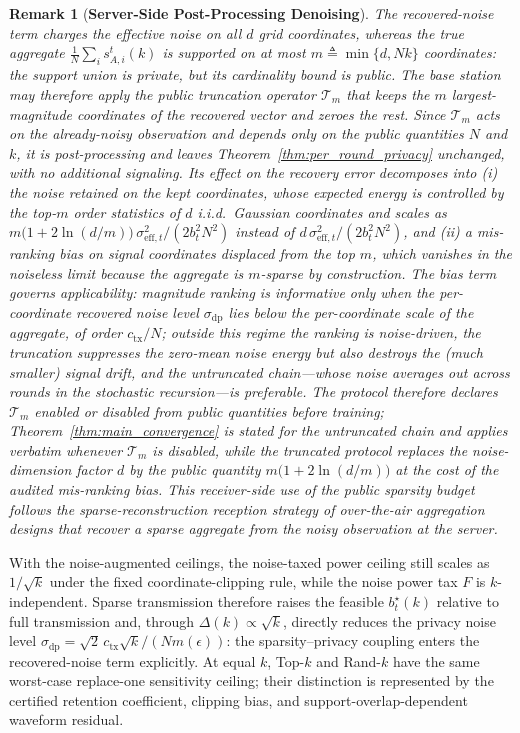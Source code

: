 \documentclass[journal]{IEEEtran}
\newtheorem{remark}{Remark}
\begin{document}
\begin{remark}[\bf Server-Side Post-Processing Denoising]
    \label{rem:denoise}
    The recovered-noise term charges the effective noise on all $d$ grid coordinates, whereas the true aggregate $\frac1N\sum_i s_{A,i}^t(k)$ is supported on at most $m\triangleq\min\{d,Nk\}$ coordinates: the support union is private, but its cardinality bound is public. The base station may therefore apply the public truncation operator $\mathcal T_m$ that keeps the $m$ largest-magnitude coordinates of the recovered vector and zeroes the rest. Since $\mathcal T_m$ acts on the already-noisy observation and depends only on the public quantities $N$ and $k$, it is post-processing and leaves Theorem~\ref{thm:per_round_privacy} unchanged, with no additional signaling. Its effect on the recovery error decomposes into (i) the noise retained on the kept coordinates, whose expected energy is controlled by the top-$m$ order statistics of $d$ i.i.d.\ Gaussian coordinates and scales as $m\big(1+2\ln(d/m)\big)\,\sigma_{\mathrm{eff},t}^2/(2b_t^2N^2)$ instead of $d\,\sigma_{\mathrm{eff},t}^2/(2b_t^2N^2)$, and (ii) a mis-ranking bias on signal coordinates displaced from the top $m$, which vanishes in the noiseless limit because the aggregate is $m$-sparse by construction. The bias term governs applicability: magnitude ranking is informative only when the per-coordinate recovered noise level $\sigma_{\mathrm{dp}}$ lies below the per-coordinate scale of the aggregate, of order $c_{\mathrm{tx}}/N$; outside this regime the ranking is noise-driven, the truncation suppresses the zero-mean noise energy but also destroys the (much smaller) signal drift, and the untruncated chain---whose noise averages out across rounds in the stochastic recursion---is preferable. The protocol therefore declares $\mathcal T_m$ enabled or disabled from public quantities before training; Theorem~\ref{thm:main_convergence} is stated for the untruncated chain and applies verbatim whenever $\mathcal T_m$ is disabled, while the truncated protocol replaces the noise-dimension factor $d$ by the public quantity $m\big(1+2\ln(d/m)\big)$ at the cost of the audited mis-ranking bias. This receiver-side use of the public sparsity budget follows the sparse-reconstruction reception strategy of over-the-air aggregation designs that recover a sparse aggregate from the noisy observation at the server.
\end{remark}

With the noise-augmented ceilings, the noise-taxed power ceiling still scales as $1/\sqrt{k}$ under the fixed coordinate-clipping rule, while the noise power tax $F$ is $k$-independent. Sparse transmission therefore raises the feasible $b_t^\star(k)$ relative to full transmission and, through $\Delta(k)\propto\sqrt k$, directly reduces the privacy noise level $\sigma_{\mathrm{dp}}=\sqrt2\,c_{\mathrm{tx}}\sqrt k/(Nm(\epsilon))$: the sparsity--privacy coupling enters the recovered-noise term explicitly. At equal $k$, Top-$k$ and Rand-$k$ have the same worst-case replace-one sensitivity ceiling; their distinction is represented by the certified retention coefficient, clipping bias, and support-overlap-dependent waveform residual.
\end{document}
